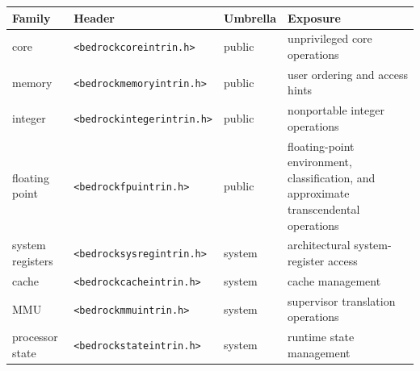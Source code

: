 \begingroup\footnotesize
\setlength{\tabcolsep}{2pt}
\begin{longtable}{@{}p{1.15in}p{1.65in}p{0.65in}p{2.15in}@{}}
\toprule
\textbf{Family} & \textbf{Header} & \textbf{Umbrella} & \textbf{Exposure}\\
\midrule
\endhead
core & \texttt{\textless{}bedrockcoreintrin.h\textgreater{}} & public & unprivileged core operations\\
memory & \texttt{\textless{}bedrockmemoryintrin.h\textgreater{}} & public & user ordering and access hints\\
integer & \texttt{\textless{}bedrockintegerintrin.h\textgreater{}} & public & nonportable integer operations\\
floating point & \texttt{\textless{}bedrockfpuintrin.h\textgreater{}} & public & floating-point environment, classification, and approximate transcendental operations\\
system registers & \texttt{\textless{}bedrocksysregintrin.h\textgreater{}} & system & architectural system-register access\\
cache & \texttt{\textless{}bedrockcacheintrin.h\textgreater{}} & system & cache management\\
MMU & \texttt{\textless{}bedrockmmuintrin.h\textgreater{}} & system & supervisor translation operations\\
processor state & \texttt{\textless{}bedrockstateintrin.h\textgreater{}} & system & runtime state management\\
\bottomrule
\end{longtable}
\endgroup
